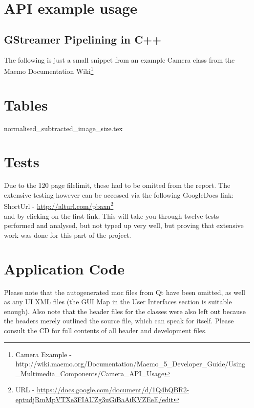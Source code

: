 \section{API example usage}
\subsection{GStreamer Pipelining in C++}
 The following is just a small snippet from an example Camera class from the Maemo Documentation Wiki\footnote{Camera Example - http://wiki.maemo.org/Documentation/Maemo\_5\_Developer\_Guide/Using\_Multimedia\_Components/Camera\_API\_Usage}

\begin{frame}{}
\vspace{-20pt}

\end{frame}

\section{Tables}
{normalised_subtracted_image_size.tex}

\section{Tests}\label{append:tests}
Due to the 120 page filelimit, these had to be omitted from the report. The extensive testing however can be accessed via the following GoogleDocs link:\\\tab ShortUrl - \url{http://alturl.com/pbaxn}\footnote{URL - \url{https://docs.google.com/document/d/1Q4bQBR2-eptudjRmMpVTXe3FIAUZg3uGiBaAiKVZEeE/edit}}\\ and by clicking on the first link. This will take you through twelve tests performed and analysed, but not typed up very well, but proving that extensive work was done for this part of the project.

\section{Application Code}
Please note that the autogenerated moc files from Qt have been omitted, as well as any UI XML files (the GUI Map in the User Interfaces section is suitable enough).  Also note that the header files for the classes were also left out because the headers merely outlined the source file, which can speak for itself. Please consult the CD for full contents of all header and development files.

